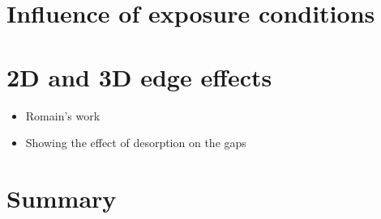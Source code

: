 \section{Influence of exposure conditions}

\section{2D and 3D edge effects} \label{3D edge effects}
\begin{itemize}
    \item Romain's work
    \item Showing the effect of desorption on the gaps
\end{itemize}
\section{Summary}